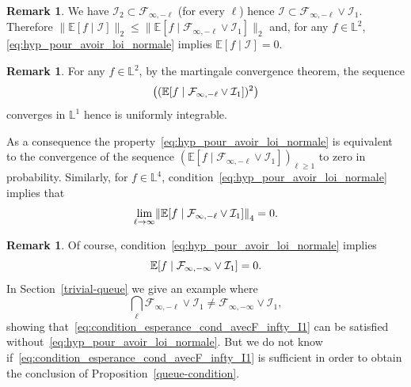 \documentclass[10pt]{amsart}
\theoremstyle{definition}\newtheorem{defi}[theo]{Definition}\newtheorem{rema}[theo]{Remark}\newtheorem{exam}[theo]{Example}\newtheorem{exem}[theo]{Example}\newtheorem{nota}[theo]{Notation}
\newcommand*\bbL{\mathbb{L}}
\newcommand{\bbE}{\mathbb{E}}
\newcommand{\E}[1]{\bbE\left[#1\right]}
\newcommand*\I{\mathcal{I}}
\newcommand*\F{\mathcal{F}}
\newcommand{\Fca}{\mathcal{F}}
\newcommand{\norm}[1]{\left\lVert #1\right\rVert}
\renewcommand*{\to}{\mathchoice{\longrightarrow}{\rightarrow}{\rightarrow}{\rightarrow}}
\let\originalleft\left
\let\originalright\right
\renewcommand{\left}{\mathopen{}\mathclose\bgroup\originalleft}
\renewcommand{\right}{\aftergroup\egroup\originalright}
\begin{document}
\begin{rema}
We have $\I_2\subset \F_{\infty, -\ell}$ (for every $\ell$) hence $\I \subset
\F_{\infty, -\ell}\vee \I_1$. Therefore $\|\bbE[f\mid\I]\|_2 \leq \|\bbE[f\mid
\F_{\infty, -\ell}\vee \I_1]\|_2$ and, for any $f\in \bbL^2$, \eqref{eq:hyp_pour_avoir_loi_normale} implies $\bbE[f\mid\I] =0$.
\end{rema}
\begin{rema}
For any $f\in\bbL^2$, by the martingale convergence theorem, the sequence
\[
\left((\bbE[f\mid \Fca_{\infty,-\ell}\vee
\I_1])^2\right)
\]
converges in $\bbL^1$ hence is uniformly
integrable.
\end{rema}

As a consequence the property~\eqref{eq:hyp_pour_avoir_loi_normale} is equivalent to the convergence of the sequence $(\bbE[f\mid\F_{\infty, -\ell}\vee \I_1])_{\ell\geq 1}$ to zero in probability. Similarly, for $f\in \bbL^4$, condition~\eqref{eq:hyp_pour_avoir_loi_normale} implies that
\begin{equation}\label{eq:hyp_pour_avoir_loi_normale_4}
\lim_{\ell\to\infty}
\norm{
\E{f\mid\F_{\infty, -\ell}\vee \I_1 }}_4=0.
\end{equation}
\begin{rema}
Of course, condition~\eqref{eq:hyp_pour_avoir_loi_normale} implies
\begin{equation}\label{eq:condition_esperance_cond_avecF_infty_I1}
\E{f\mid \F_{\infty, -\infty}\vee \I_1}=0.
\end{equation}
In Section~\ref{trivial-queue} we give an example where
\[
\bigcap_\ell \F_{\infty, -\ell}\vee \I_1\neq\F_{\infty, -\infty}\vee \I_1,
\]
showing that~\eqref{eq:condition_esperance_cond_avecF_infty_I1} can be satisfied without~\eqref{eq:hyp_pour_avoir_loi_normale}. But we do not know if~\eqref{eq:condition_esperance_cond_avecF_infty_I1} is sufficient in order to obtain the conclusion of Proposition~\ref{queue-condition}.
\end{rema}
\end{document}
